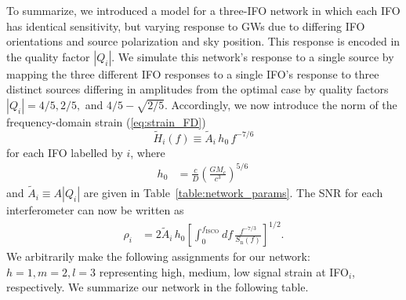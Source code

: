 \documentclass[prd,amsmath,amssymb,aps,floats,amsfonts,notitlepage,superscriptaddress,eqsecnum,nofootinbib,10pt]{revtex4-1}
\newcommand{\f}{\frac}
\newcommand{\be}{\begin{equation}}
\newcommand{\ee}{\end{equation}}
\begin{document}
To summarize, we introduced a model for a three-IFO network in which each IFO has identical sensitivity,
but varying response to GWs due to differing IFO orientations and source polarization and sky position. This response is encoded in the quality factor $|Q_i|$.
We simulate this network's response to a single source by mapping the three different IFO responses to a single IFO's response to three distinct sources differing in amplitudes 
from the optimal case by quality factors $|Q_i|= 4/5,2/5,$ and $4/5-\sqrt{2/5}$.
%
%
%
Accordingly, we now introduce the norm of the frequency-domain strain (\ref{eq:strain_FD}) 
%
\be
\tilde{H}_i(f)\equiv \tilde{A}_i\, h_0\, f^{-7/6} \label{eq:Hi_s}
\ee
%
for each IFO labelled by $i$, where
%
\begin{align}
h_0 &= \f{c}{D}\left(\f{G M_c}{c^3}\right)^{5/6} \label{eq:h0}\, 
\end{align}
%
and $\tilde{A}_i\equiv A |Q_i|$ %
are given in Table~\ref{table:network_params}. %
The SNR for each interferometer can now be written as
%
\begin{align}
\rho_i &= 2\tilde{A}_i\, h_0 \left[\int_0^{f_\text{ISCO}} df\, \f{f^{-7/3}}{S_\text{n}(f)} \right]^{1/2}\label{eq:SNR_i}.
\end{align}
%
We arbitrarily make the following assignments for our network: $h=1, m=2, l=3$ representing high, medium, low signal strain
at IFO$_i$, respectively. 
We summarize our network in the following table.
\end{document}
